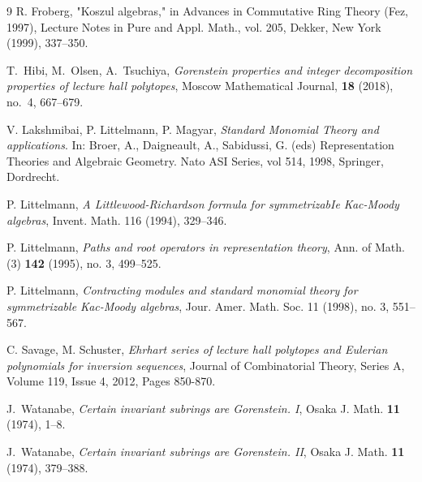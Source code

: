 \documentclass[12pt, a4paper]{amsart}   	%
\numberwithin{equation}{section}
\theoremstyle{plain}
\theoremstyle{definition}
\begin{document}
\begin{thebibliography}{9}
R. Froberg, "Koszul algebras," in Advances in Commutative Ring Theory (Fez, 1997), Lecture Notes in Pure and Appl. Math., vol. 205, Dekker, New York (1999), 337--350.

 T.~Hibi, M.~Olsen, A.~Tsuchiya, \emph{Gorenstein properties and integer decomposition properties of lecture hall polytopes}, Moscow Mathematical Journal, \textbf{18} (2018), no.~4, 667--679.

V. Lakshmibai, P. Littelmann, P. Magyar, 
\emph{Standard Monomial Theory and applications}. In: Broer, A., Daigneault, A., Sabidussi, G. (eds) Representation Theories and Algebraic Geometry. Nato ASI Series, vol 514, 1998, Springer, Dordrecht.

P. Littelmann, 
\emph{A Littlewood-Richardson formula for symmetrizabIe Kac-Moody algebras}, Invent. Math. 116 (1994), 329--346.

 P. Littelmann, \emph{Paths and root operators in representation theory}, Ann. of Math. (3) \textbf{142} (1995), no. 3, 499--525.

P. Littelmann, 
\emph{Contracting modules and standard monomial theory for symmetrizable Kac-Moody algebras}, Jour. Amer. Math. Soc. 11 (1998), no. 3, 551--567.

C. Savage, M. Schuster,
\emph{Ehrhart series of lecture hall polytopes and Eulerian polynomials for inversion sequences},
Journal of Combinatorial Theory, Series A, Volume 119, Issue 4, 2012,
Pages 850-870.

 J.~Watanabe, \emph{Certain invariant subrings are Gorenstein. I}, Osaka J. Math. \textbf{11} (1974), 1--8.

 J.~Watanabe, \emph{Certain invariant subrings are Gorenstein. II}, Osaka J. Math. \textbf{11} (1974), 379--388.


\end{thebibliography}
\end{document}
